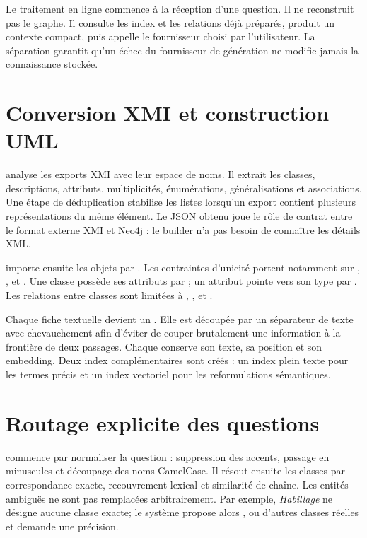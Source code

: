 Le traitement en ligne commence à la réception d'une question. Il ne reconstruit pas le
graphe. Il consulte les index et les relations déjà préparés, produit un contexte compact,
puis appelle le fournisseur choisi par l'utilisateur. La séparation garantit qu'un échec
du fournisseur de génération ne modifie jamais la connaissance stockée.

\section{Conversion XMI et construction UML}

 analyse les exports XMI avec leur espace de noms.
Il extrait les classes, descriptions, attributs, multiplicités, énumérations, généralisations
et associations. Une étape de déduplication stabilise les listes lorsqu'un export contient
plusieurs représentations du même élément. Le JSON obtenu joue le rôle de contrat entre le
format externe XMI et Neo4j : le builder n'a pas besoin de connaître les détails XML.

 importe ensuite les objets par . Les
contraintes d'unicité portent notamment sur , ,
 et . Une classe possède ses attributs par
; un attribut pointe vers son type par . Les
relations entre classes sont limitées à , ,
 et .

Chaque fiche textuelle devient un . Elle est découpée par un séparateur de
texte avec chevauchement afin d'éviter de couper brutalement une information à la frontière
de deux passages. Chaque  conserve son texte, sa position et son embedding.
Deux index complémentaires sont créés : un index plein texte pour les termes précis et un
index vectoriel pour les reformulations sémantiques.

\section{Routage explicite des questions}

 commence par normaliser la question : suppression des accents,
passage en minuscules et découpage des noms CamelCase. Il résout ensuite les classes par
correspondance exacte, recouvrement lexical et similarité de chaîne. Les entités ambiguës
ne sont pas remplacées arbitrairement. Par exemple, \emph{Habillage} ne désigne aucune
classe exacte; le système propose alors , 
ou d'autres classes réelles et demande une précision.

